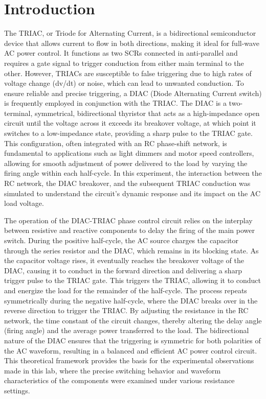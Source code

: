 \documentclass[12pt,a4paper]{article}
\begin{document}
\section{Introduction}
The TRIAC, or Triode for Alternating Current, is a bidirectional semiconductor device that allows current to flow in both directions, making it ideal for full-wave AC power control. It functions as two SCRs connected in anti-parallel and requires a gate signal to trigger conduction from either main terminal to the other. However, TRIACs are susceptible to false triggering due to high rates of voltage change (dv/dt) or noise, which can lead to unwanted conduction. To ensure reliable and precise triggering, a DIAC (Diode Alternating Current switch) is frequently employed in conjunction with the TRIAC. The DIAC is a two-terminal, symmetrical, bidirectional thyristor that acts as a high-impedance open circuit until the voltage across it exceeds its breakover voltage, at which point it switches to a low-impedance state, providing a sharp pulse to the TRIAC gate. This configuration, often integrated with an RC phase-shift network, is fundamental to applications such as light dimmers and motor speed controllers, allowing for smooth adjustment of power delivered to the load by varying the firing angle within each half-cycle. In this experiment, the interaction between the RC network, the DIAC breakover, and the subsequent TRIAC conduction was simulated to understand the circuit's dynamic response and its impact on the AC load voltage.

The operation of the DIAC-TRIAC phase control circuit relies on the interplay between resistive and reactive components to delay the firing of the main power switch. During the positive half-cycle, the AC source charges the capacitor through the series resistor and the DIAC, which remains in its blocking state. As the capacitor voltage rises, it eventually reaches the breakover voltage of the DIAC, causing it to conduct in the forward direction and delivering a sharp trigger pulse to the TRIAC gate. This triggers the TRIAC, allowing it to conduct and energize the load for the remainder of the half-cycle. The process repeats symmetrically during the negative half-cycle, where the DIAC breaks over in the reverse direction to trigger the TRIAC. By adjusting the resistance in the RC network, the time constant of the circuit changes, thereby altering the delay angle (firing angle) and the average power transferred to the load. The bidirectional nature of the DIAC ensures that the triggering is symmetric for both polarities of the AC waveform, resulting in a balanced and efficient AC power control circuit. This theoretical framework provides the basis for the experimental observations made in this lab, where the precise switching behavior and waveform characteristics of the components were examined under various resistance settings.
\end{document}
